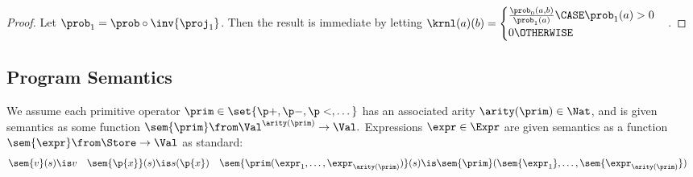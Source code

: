 \documentclass[acmsmall,nonacm,screen,appendix]{acmart}
\begin{document}
\begin{proof}
  Let $\prob_1 = \prob \circ \inv{\proj_1}$.
  Then the result is immediate by letting
  $
    \krnl(a)(b) =
      \begin{cases}
        \frac{\prob_0(a,b)}{\prob_1(a)}
          \CASE \prob_1(a) > 0
        \\
        0 \OTHERWISE
      \end{cases}
  $.
\end{proof}

\subsection{Program Semantics}

We assume each primitive operator $\prim \in \set{\p+,\p-,\p<,\dots}$
has an associated arity $\arity(\prim) \in \Nat$, and
is given semantics as some function
$ \sem{\prim} \from \Val^{\arity(\prim)} \to \Val. $
Expressions $\expr \in \Expr$ are given semantics as a function
$ \sem{\expr} \from \Store \to \Val $
as standard:
\begin{align*}
  \sem{v}(s) &\is v
  &
  \sem{\p{x}}(s) &\is s(\p{x})
  &
  \sem{\prim(\expr_1,\dots,\expr_{\arity(\prim)})}(s) &\is
    \sem{\prim}(\sem{\expr_1},\dots,\sem{\expr_{\arity(\prim)}})
\end{align*}
\end{document}
